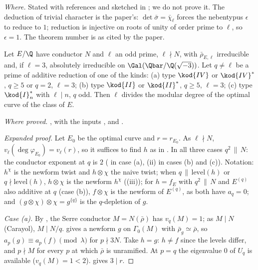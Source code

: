 \begin{sloppypar}
\noindent\emph{Where.} Stated with references and sketched in ; we do not prove it. The deduction of trivial character is the paper's: $\det\bar\sigma=\bar\chi_\ell$ forces
the nebentypus $\epsilon$ to reduce to $1$; reduction is injective on roots of unity of order prime to $\ell$, so $\epsilon=1$. The theorem number is as cited by the paper.

\begin{theorem}\label{thm:paper:qual}
Let $E/\Q$ have conductor $N$ and $\ell$ an odd prime, $\ell\nmid N$, with $\bar\rho_{E,\ell}$ irreducible and, if $\ell=3$, absolutely irreducible on $\Gal(\Qbar/\Q(\sqrt{-3}))$. Let $q\ne\ell$ be a
prime of additive reduction of one of the kinds: (a) type $\kod{IV}$ or $\kod{IV}^*$, $q\ge5$ or $q=2$, $\ell=3$; (b) type $\kod{II}$ or $\kod{II}^*$, $q\ge5$, $\ell=3$; (c) type $\kod{I}_n^*$ with $\ell\mid n$,
$q$ odd. Then $\ell$ divides the modular degree of the optimal curve of the class of $E$.
\end{theorem}

\noindent\emph{Where proved.} , with the inputs ,  and
\cite[Theorem 2.2]{ARS12}.

\begin{proof}[Expanded proof]
Let $E_0$ be the optimal curve and $r=r_{E_0}$. As $\ell\nmid N$, $v_\ell(\deg\varphi_{E_0})=v_\ell(r)$, so it suffices to find $h$ as in . In all three cases $q^2\,\|\,N$: the
conductor exponent at $q$ is $2$ ( in case (a), (ii) in cases (b) and (c)). Notation: $h^\chi$ is the newform twist and $h\otimes\chi$ the naive
twist; when $q\,\|\,\mathrm{level}(h)$ or $q\nmid\mathrm{level}(h)$, $h\otimes\chi$ is the newform $h^\chi$ ((iii)); for $h=f_E$ with $q^2\,\|\,N$ and $E^{(q)}$ also additive at $q$ (case (b)), $f\otimes\chi$ is the
newform of $E^{(q)}$, as both have $a_q=0$; and $(g\otimes\chi)\otimes\chi=g^{\{q\}}$ is the $q$-depletion of $g$.

\emph{Case (a).} By , the Serre conductor $M=N(\bar\rho)$ has $v_q(M)=1$; as $M\mid N$ (Carayol), $M\mid N/q$.  gives a newform $g$ on $\Gamma_0(M)$ with
$\bar\rho_g\simeq\bar\rho$, so $a_p(g)\equiv a_p(f)\pmod\lambda$ for $p\nmid3N$. Take $h=g$: $h\ne f$ since the levels differ, and $p\nmid M$ for every $p$ at which $\bar\rho$ is unramified. At $p=q$ the
eigenvalue $0$ of $U_q$ is available ($v_q(M)=1<2$).  gives $3\mid r$.


\end{proof}
\end{sloppypar}
